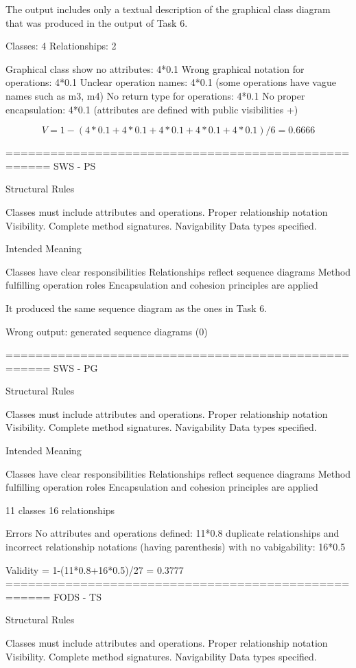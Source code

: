 The output includes only a textual description of the graphical class diagram that was produced in the output of Task 6. 

Classes: 4
Relationships: 2

Graphical class show no attributes: 4*0.1
Wrong graphical notation for operations: 4*0.1
Unclear operation names: 4*0.1 (some operations have vague names such as m3, m4)
No return type for operations: 4*0.1 
No proper encapsulation: 4*0.1 (attributes are defined with public visibilities +)

$$
V = 1 -(4*0.1+4*0.1+4*0.1+4*0.1+4*0.1)/6= 0.6666
$$

====================================================
SWS - PS

Structural Rules

Classes must include attributes and operations.
Proper relationship notation 
Visibility.
Complete method signatures.
Navigability
Data types specified.

Intended Meaning

Classes have clear responsibilities
Relationships reflect sequence diagrams
Method fulfilling operation roles
Encapsulation and cohesion principles are applied

It produced the same sequence diagram as the ones in Task 6. 

Wrong output: generated sequence diagrams (0)

====================================================
SWS - PG

Structural Rules

Classes must include attributes and operations.
Proper relationship notation 
Visibility.
Complete method signatures.
Navigability
Data types specified.

Intended Meaning

Classes have clear responsibilities
Relationships reflect sequence diagrams
Method fulfilling operation roles
Encapsulation and cohesion principles are applied

11 classes
16 relationships

Errors
No attributes and operations defined: 11*0.8
duplicate relationships and incorrect relationship notations (having parenthesis) with no vabigability:  16*0.5

Validity = 1-(11*0.8+16*0.5)/27 = 0.3777
====================================================
FODS - TS

Structural Rules

Classes must include attributes and operations.
Proper relationship notation 
Visibility.
Complete method signatures.
Navigability
Data types specified.

